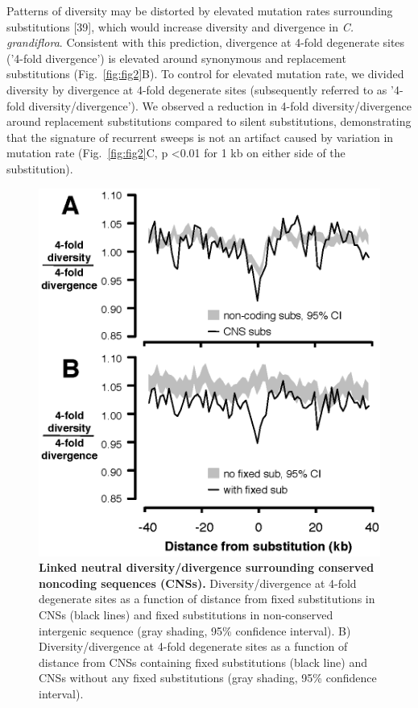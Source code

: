 Patterns of diversity may be distorted by elevated mutation rates surrounding substitutions [39], which would increase diversity and divergence in \textit{C. grandiflora}. Consistent with this prediction, divergence at 4-fold degenerate sites ('4-fold divergence') is elevated around synonymous and replacement substitutions (Fig.~\ref{fig:fig2}B). To control for elevated mutation rate, we divided diversity by divergence at 4-fold degenerate sites (subsequently referred to as '4-fold diversity/divergence'). We observed a reduction in 4-fold diversity/divergence around replacement substitutions compared to silent substitutions, demonstrating that the signature of recurrent sweeps is not an artifact caused by variation in mutation rate (Fig.~\ref{fig:fig2}C, p \textless  0.01 for 1 kb on either side of the substitution).

\begin{figure}[h!]
      \centering
       \includegraphics{Ch2Fig3}
    \caption{\textbf{Linked neutral diversity/divergence surrounding conserved noncoding sequences (CNSs).} Diversity/divergence at 4-fold degenerate sites as a function of distance from fixed substitutions in CNSs (black lines) and fixed substitutions in non-conserved intergenic sequence (gray shading, 95\% confidence interval).
B) Diversity/divergence at 4-fold degenerate sites as a function of distance from CNSs containing fixed substitutions (black line) and CNSs without any fixed substitutions (gray shading, 95\% confidence interval).}
    \label{fig:fig3}
\end{figure}

